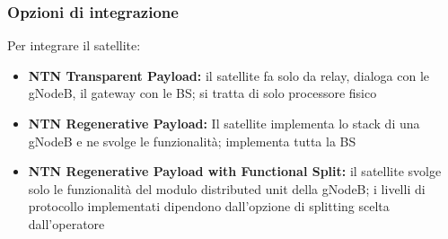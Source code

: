 \subsubsection{Opzioni di integrazione}

Per integrare il satellite: 
\begin{itemize}
    \item \textbf{NTN Transparent Payload:} il satellite fa solo da relay, dialoga con le gNodeB, il gateway con le BS; si tratta di solo processore fisico
    
    \item \textbf{NTN Regenerative Payload:} Il satellite implementa lo stack di una gNodeB e ne svolge le funzionalità; implementa tutta la BS
    
    \item \textbf{NTN Regenerative Payload with Functional Split:} il satellite svolge solo le funzionalità del modulo distributed unit della gNodeB; i livelli di protocollo implementati dipendono dall'opzione di splitting scelta dall'operatore
\end{itemize}